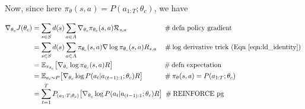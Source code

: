 \documentclass[11pt, oneside]{article}   	%
\begin{document}
\bigskip
\noindent
Now, since here $\pi_\theta(s,a) = P(a_{1:T};\theta_c)$, we have  
 
 \bigskip
 \noindent
 
\begin{align}
\nabla_{\theta_{c}} J(\theta_c) 
&= \sum\limits_{s \in S} d(s) \sum\limits_{a \in A} \nabla_{\theta_c}\pi_{\theta_c}(s,a) \mathcal{R}_{s,a}
\qquad \qquad \quad \; \mathbin{\#}\text{defn policy gradient} \\ 
&=  \sum\limits_{s \in S} d(s) \sum\limits_{a \in A} \pi_{\theta_c}(s,a) \nabla \log \pi_{\theta_c}(s,a) R_{s,a} 
\quad \mathbin{\#} \text{log derivative trick (Eqn \ref{eqn:ld_identity})
}  \\      
& =  \mathbb{E}_{\pi_{\theta_c}} \big [ \nabla_{\theta_c} \log \pi_{\theta_c}(s,a)R\big]
\qquad \qquad \qquad \quad \;  \mathbin{\#} \text{defn expectation}  \\
&= \mathbb{E}_{a_i \sim  P} \big [\nabla_{\theta_c}  \log P(a_t | a_{(t-1):1};\theta_c) R \big] \qquad \quad  \mathbin{\#} \pi_\theta(s,a) = P(a_{1:T};\theta_c) \\     
& = \sum\limits_{t = 1}^{T} P_{(a_1:T;\theta_c)} \big [ \nabla_{\theta_c} \log P(a_t | a_{(t-1):1};\theta_c) R \big]  
\;  \mathbin{\#} \text{REINFORCE pg}
\end{align}
\end{document}
